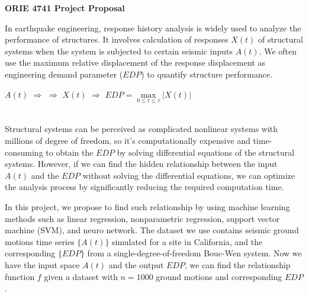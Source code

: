 \documentclass[a4paper,12pt]{article}
\begin{document}
\begin{center}
\Large{\textbf{ORIE 4741 Project Proposal}}\\
\vspace{10pt}
\end{center}
In earthquake engineering, response history analysis is widely used to analyze the performance of structures. It involves calculation of responses $X(t)$ of structural systems when the system is subjected to certain seismic inputs $A(t)$. We often use the maximum relative displacement of the response displacement as engineering demand parameter ($EDP$) to quantify structure performance. 

\begin{center}
          $A(t)$ $\Rightarrow$ \setlength{\fboxrule}{1.5pt} $\Rightarrow$ $X(t)$ $\Rightarrow$ $EDP = \max\limits_{0\leqslant t\leqslant \tau}|X(t)|$\\~\\
\end{center}

Structural systems can be perceived as complicated nonlinear systems with millions of degree of freedom, so it's computationally expensive and time-consuming to obtain the $EDP$ by solving differential equations of the structural systems. However, if we can find the hidden relationship between the input $A(t)$ and the $EDP$ without solving the differential equations, we can optimize the analysis process by significantly reducing the required computation time. 

In this project, we propose to find such relationship by using machine learning methods such as linear regression, nonparametric regression, support vector machine (SVM), and neuro network. The dataset we use contains seismic ground motions time series $\{A(t)\}$ simulated for a site in California, and the corresponding $\{EDP\}$ from a single-degree-of-freedom Bouc-Wen system. Now we have the input space $A(t)$ and the output $EDP$, we can find the relationship function $f$ given a dataset with $n=1000$ ground motions and corresponding $EDP$.
\end{document}
